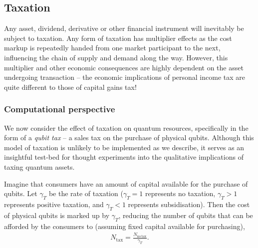 %
%

\subsection{Taxation}\label{sec:taxation}

Any asset, dividend, derivative or other financial instrument will inevitably be subject to taxation. Any form of taxation has multiplier effects as the cost markup is repeatedly handed from one market participant to the next, influencing the chain of supply and demand along the way. However, this multiplier and other economic consequences are highly dependent on the asset undergoing transaction -- the economic implications of personal income tax are quite different to those of capital gains tax!

\subsubsection{Computational perspective}

We now consider the effect of taxation on quantum resources, specifically in the form of a \textit{qubit tax} -- a sales tax on the purchase of physical qubits. Although this model of taxation is unlikely to be implemented as we describe, it serves as an insightful test-bed for thought experiments into the qualitative implications of taxing quantum assets.

Imagine that consumers have an amount of capital available for the purchase of qubits. Let $\gamma_T$ be the rate of taxation (\mbox{$\gamma_T=1$} represents no taxation, \mbox{$\gamma_T>1$} represents positive taxation, and \mbox{$\gamma_T<1$} represents subsidisation). Then the cost of physical qubits is marked up by $\gamma_T$, reducing the number of qubits that can be afforded by the consumers to (assuming fixed capital available for purchasing),
\begin{align}
	N_\mathrm{tax} = \frac{N_\mathrm{no\,tax}}{\gamma_T}.
\end{align}

